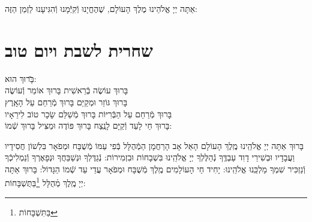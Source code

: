 \documentclass[twoside, openany, parskip=half, 11pt]{book}
\begin{document}
אַתָּה יְיָ אֱלֹהֵינוּ מֶלֶךְ הָעוֹלָם, שֶׁהֶחֱיָנוּ וְֿקִיְּֿֿמָנוּ וְֿהִגִּיעָנוּ לַזְמַן הַזֶּה:



\chapter[שחרית לשבת ויום טוב]{ שחרית לשבת ויום טוב }

\begin{tabbing}

 \hspace{.5in} \= בָּרוּךְ הוּא: \\
בָּרוּךְ עוֹשֶׂה בְֿרֵאשִׁית \> בָּרוּךְ אוֹמֵר וְֿעוֹשֶׂה \\
בָּרוּךְ גּוֹזֵר וּמְקַיֵּם \> בָּרוּךְ מְֿרַחֵם עַל הָאָֽרֶץ \\
בָּרוּךְ מְֿרַחֵם עַל הַבְּֿרִיּוֹת \> בָּרוּךְ מְֿשַׁלֵּם שָׂכָר טוֹב לִירֵאָיו \\
בָּרוּךְ חַי לָעַד וְֿקַיָּם לָנֶֽצַח \> בָּרוּךְ פּוֹדֶה וּמַצִּיל בָּרוּךְ שְֿׁמוֹ: \\
\end{tabbing}
\vspace{-2\baselineskip}
בָּרוּךְ אַתָּה יְיָ אֱלֹהֵֽינוּ מֶֽלֶךְ הָעוֹלָם הָאֵל אָב הָרַחֲמָן הַמְֿהֻלָּל בְּֿפִי עַמּוֹ מְֿשֻׁבָּח וּמְפֹאָר בִּלְשׁוֹן חֲסִידָיו וַעֲבָדָיו וּבְשִׁירֵי דָוִד עַבְדֶּֽךָ נְֿהַלֶּלְךָ יְיָ אֱלֹהֵֽינוּ בִּשְׁבָחוֹת וּבִזְמִירוֹת: נְֿגַדֶּלְךָ וּנְשַׁבֵּחֲךָ וּנְפָאֶרְךָ וְֿנַמְלִיכְֿךָ וְֿנַזְכִּיר שִׁמְךָ מַלְכֵּֽנוּ אֱלֹהֵֽינוּ:
יָחִיד חַי הָעוֹלָמִים מֶֽלֶךְ מְֿשֻׁבָּח וּמְפֹאָר עֲדֵי עַד שְֿׁמוֹ הַגָּדוֹל: בָּרוּךְ אַתָּה יְיָ מֶֽלֶךְ מְֿהֻלָּל \footnote{בַּתִּשְׁבָּחוֹת}בַּתֻּשְׁבָּחוֹת:
\end{document}
